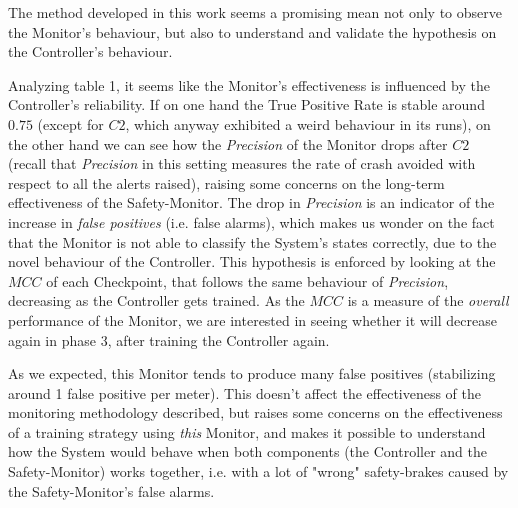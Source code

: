 \vspace{0.5cm}

The method developed in this work seems a promising mean not only to observe the Monitor's behaviour, but also to understand and validate the hypothesis on the Controller's behaviour.\newline

Analyzing table 1, it seems like the Monitor's effectiveness is influenced by the Controller's reliability. If on one hand the True Positive Rate is stable around $0.75$ (except for $C2$, which anyway exhibited a weird behaviour in its runs), on the other hand we can see how the \textsl{Precision} of the Monitor drops after $C2$ (recall that \textsl{Precision} in this setting measures the rate of crash avoided with respect to all the alerts raised), raising some concerns on the long-term effectiveness of the Safety-Monitor. The drop in \textsl{Precision} is an indicator of the increase in \textsl{false positives} (i.e. false alarms), which makes us wonder on the fact that the Monitor is not able to classify the System's states correctly, due to the novel behaviour of the Controller. This hypothesis is enforced by looking at the $MCC$ of each Checkpoint, that follows the same behaviour of \textsl{Precision}, decreasing as the Controller gets trained. As the $MCC$ is a measure of the \textsl{overall} performance of the Monitor, we are interested in seeing whether it will decrease again in phase 3, after training the Controller again.

As we expected, this Monitor tends to produce many false positives (stabilizing around 1 false positive per meter). This doesn't affect the effectiveness of the monitoring methodology described, but raises some concerns on the effectiveness of a training strategy using \textsl{this} Monitor, and makes it possible to understand how the System would behave when both components (the Controller and the Safety-Monitor) works together, i.e. with a lot of "wrong" safety-brakes caused by the Safety-Monitor's false alarms.

